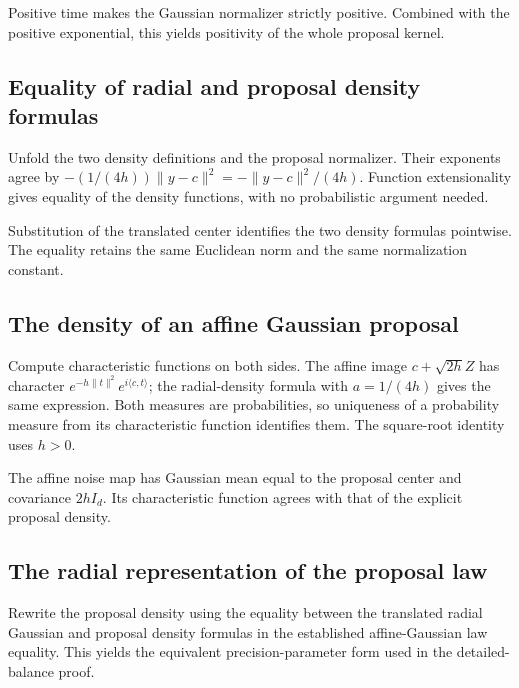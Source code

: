 \documentclass[11pt,a4paper]{report}
\begin{document}
Positive time makes the Gaussian normalizer strictly positive. Combined with the positive exponential, this yields positivity of the whole proposal kernel.

\subsection{\texorpdfstring{Equality of radial and proposal density formulas}{Equality of radial and proposal density formulas}}
\label{report-step-UnadjustedLangevin-GaussianProposalDensity-lean-15}


Unfold the two density definitions and the proposal normalizer. Their exponents agree by \(-(1/(4h))\|y-c\|^2=-\|y-c\|^2/(4h)\). Function extensionality gives equality of the density functions, with no probabilistic argument needed.



Substitution of the translated center identifies the two density formulas pointwise. The equality retains the same Euclidean norm and the same normalization constant.

\subsection{\texorpdfstring{The density of an affine Gaussian proposal}{The density of an affine Gaussian proposal}}
\label{report-step-UnadjustedLangevin-GaussianProposalDensity-lean-16}


Compute characteristic functions on both sides. The affine image \(c+\sqrt{2h}Z\) has character \(e^{-h\|t\|^2}e^{i\langle c,t\rangle}\); the radial-density formula with \(a=1/(4h)\) gives the same expression. Both measures are probabilities, so uniqueness of a probability measure from its characteristic function identifies them. The square-root identity uses \(h>0\).



The affine noise map has Gaussian mean equal to the proposal center and covariance \(2hI_d\). Its characteristic function agrees with that of the explicit proposal density.

\subsection{\texorpdfstring{The radial representation of the proposal law}{The radial representation of the proposal law}}
\label{report-step-UnadjustedLangevin-GaussianProposalDensity-lean-17}


Rewrite the proposal density using the equality between the translated radial Gaussian and proposal density formulas in the established affine-Gaussian law equality. This yields the equivalent precision-parameter form used in the detailed-balance proof.
\end{document}
